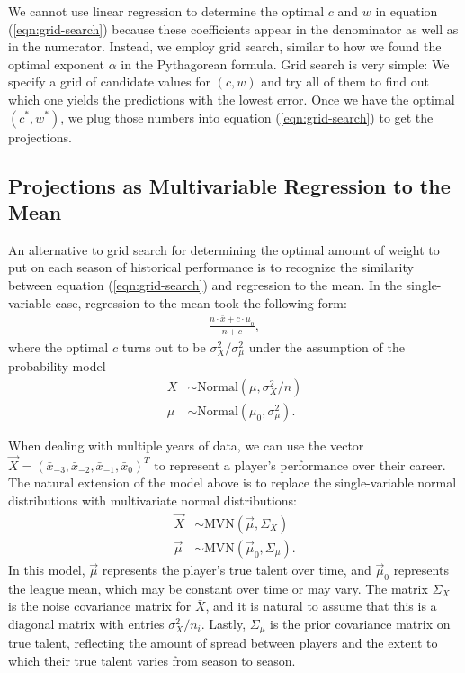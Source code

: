 \documentclass{article}
\begin{document}
    We cannot use linear regression to determine the optimal $c$ and $w$ in equation (\ref{eqn:grid-search}) because these coefficients appear in the denominator as well as in the numerator. Instead, we employ grid search, similar to how we found the optimal exponent $\alpha$ in the Pythagorean formula. Grid search is very simple: We specify a grid of candidate values for $(c, w)$ and try all of them to find out which one yields the predictions with the lowest error. Once we have the optimal $(c^*, w^*)$, we plug those numbers into equation (\ref{eqn:grid-search}) to get the projections.

  \subsection{\sc Projections as Multivariable Regression to the Mean}

    An alternative to grid search for determining the optimal amount of weight to put on each season of historical performance is to recognize the similarity between equation (\ref{eqn:grid-search}) and regression to the mean. In the single-variable case, regression to the mean took the following form:
    \begin{align*}
      \frac{n \cdot \bar x + c \cdot \mu_0}{n + c},
    \end{align*}
    where the optimal $c$ turns out to be $\sigma^2_X / \sigma^2_\mu$ under the assumption of the probability model
    \begin{align*}
      X &\sim \mbox{Normal}(\mu, \sigma^2_X / n)\\
      \mu &\sim \mbox{Normal}(\mu_0, \sigma^2_\mu).
    \end{align*}

    When dealing with multiple years of data, we can use the vector $\vec X = (\bar x_{-3}, \bar x_{-2}, \bar x_{-1}, \bar x_0)^T$ to represent a player's performance over their career. The natural extension of the model above is to replace the single-variable normal distributions with multivariate normal distributions:
    \begin{align*}
      \vec X &\sim \mbox{MVN}(\vec\mu, \Sigma_X)\\
      \vec\mu &\sim \mbox{MVN}(\vec\mu_0, \Sigma_\mu).
    \end{align*}
    In this model, $\vec \mu$ represents the player's true talent over time, and $\vec \mu_0$ represents the league mean, which may be constant over time or may vary. The matrix $\Sigma_X$ is the noise covariance matrix for $\bar X$, and it is natural to assume that this is a diagonal matrix with entries $\sigma^2_X / n_i$. Lastly, $\Sigma_\mu$ is the prior covariance matrix on true talent, reflecting the amount of spread between players and the extent to which their true talent varies from season to season.
\end{document}
